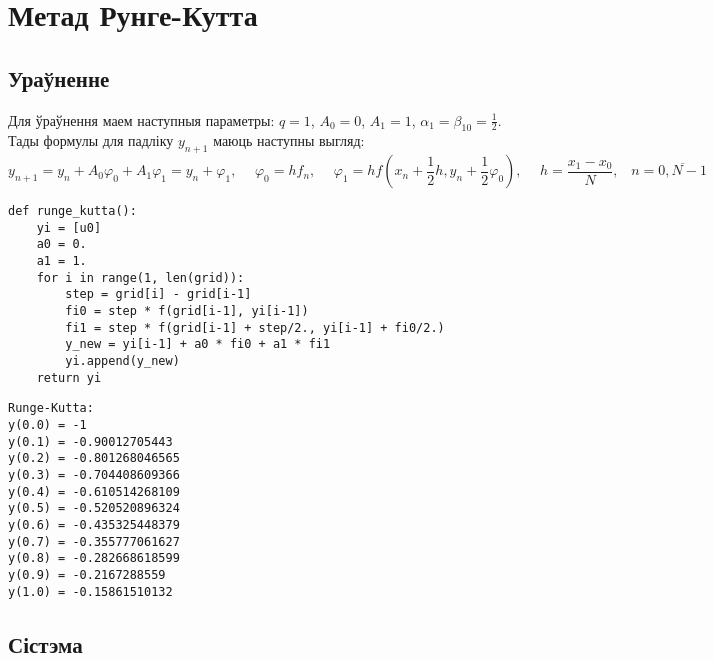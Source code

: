 \section{Метад Рунге-Кутта}
\subsection*{Ураўненне}

Для ўраўнення маем наступныя параметры: $q=1$, $A_0=0$, $A_1=1$, $\alpha _1 = \beta _{10} = \frac{1}{2}$. \\
Тады формулы для падліку $y_{n+1}$ маюць наступны выгляд:
\[
y_{n+1} = y_n + A_0 \varphi_0 + A_1 \varphi_1 = y_n + \varphi_1, \hspace{15pt} \varphi_0 = hf_n, \hspace{15pt}
\varphi_1 = hf(x_n+ \frac{1}{2} h, y_n + \frac{1}{2} \varphi_0), \hspace{15pt} h = \frac{x_1-x_0}{N}, \hspace{10pt} n = \overline{0, N-1}
\]

{\small
\begin{verbatim}
def runge_kutta():
    yi = [u0]
    a0 = 0.
    a1 = 1.
    for i in range(1, len(grid)):
        step = grid[i] - grid[i-1]
        fi0 = step * f(grid[i-1], yi[i-1])
        fi1 = step * f(grid[i-1] + step/2., yi[i-1] + fi0/2.)
        y_new = yi[i-1] + a0 * fi0 + a1 * fi1
        yi.append(y_new)
    return yi
\end{verbatim}
}

{\small
\begin{verbatim}
Runge-Kutta:
y(0.0) = -1
y(0.1) = -0.90012705443
y(0.2) = -0.801268046565
y(0.3) = -0.704408609366
y(0.4) = -0.610514268109
y(0.5) = -0.520520896324
y(0.6) = -0.435325448379
y(0.7) = -0.355777061627
y(0.8) = -0.282668618599
y(0.9) = -0.2167288559
y(1.0) = -0.15861510132
\end{verbatim}
}

\subsection*{Сістэма}

